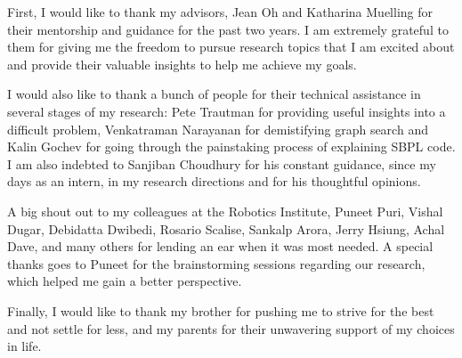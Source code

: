 First, I would like to thank my advisors, Jean Oh and Katharina Muelling for their mentorship and guidance for the past two years. I am extremely grateful to them for giving me the freedom to pursue research topics that I am excited about and provide their valuable insights to help me achieve my goals.

I would also like to thank a bunch of people for their technical assistance in several stages of my research: Pete Trautman for providing useful insights into a difficult problem, Venkatraman Narayanan for demistifying graph search and Kalin Gochev for going through the painstaking process of explaining SBPL code. I am also indebted to Sanjiban Choudhury for his constant guidance, since my days as an intern, in my research directions and for his thoughtful opinions.

A big shout out to my colleagues at the Robotics Institute, Puneet Puri, Vishal Dugar, Debidatta Dwibedi, Rosario Scalise, Sankalp Arora, Jerry Hsiung, Achal Dave, and many others for lending an ear when it was most needed. A special thanks goes to Puneet for the brainstorming sessions regarding our research, which helped me gain a better perspective.

Finally, I would like to thank my brother for pushing me to strive for the best and not settle for less, and my parents for their unwavering support of my choices in life.
